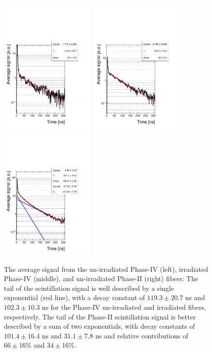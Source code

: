 \documentclass[a4paper,11pt]{article}
\begin{document}
\begin{figure}[ht]
\begin{center}
      \includegraphics[width=4.8cm]{Figures/B5_R11864_fit_zoom_singleLog.pdf}
      \includegraphics[width=4.8cm]{Figures/B4_R11863_fit_zoom_singleLog.pdf}
      \includegraphics[width=4.8cm]{Figures/B1_R11862_fit_zoom_singleLog.pdf}
\caption{\small The average signal from the un-irradiated Phase-IV (left), irradiated Phase-IV (middle), and un-irradiated Phase-II (right) fibers: The tail of the scintillation signal is well described by a single exponential (red line), with a decay constant of $119.3 \pm 20.7$ ns and $102.3 \pm 10.3$ ns for the Phase-IV un-irradiated and irradiated fibers, respectively. The tail of the Phase-II scintillation signal is better described by a sum of two exponentials, with decay constants of $101.4 \pm 16.4$ ns and $31.1  \pm 7.8$ ns and relative contributions of $66 \pm 16 \%$ and $34 \pm 16 \%$.}
    \label{fig:phase4scintTime}
\end{center}
\end{figure}
\end{document}
